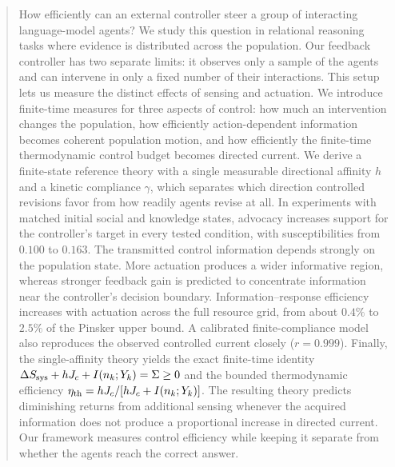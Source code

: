 \begin{abstract}
How efficiently can an external controller steer a group of interacting
language-model agents? We study this question in relational reasoning tasks
where evidence is distributed across the population. Our feedback controller
has two separate limits: it observes only a sample of the agents and can
intervene in only a fixed number of their interactions. This setup lets us
measure the distinct effects of sensing and actuation. We introduce finite-time
measures for three aspects of control: how much an intervention changes the
population, how efficiently action-dependent information becomes coherent
population motion, and how efficiently the finite-time thermodynamic control
budget becomes directed current. We derive a finite-state reference theory with a
single measurable directional affinity $h$ and a kinetic compliance $\gamma$,
which separates which direction controlled revisions favor from how readily
agents revise at all. In experiments with matched initial social and knowledge
states, advocacy increases support for the controller's target in every tested
condition, with susceptibilities from $0.100$ to $0.163$. The transmitted
control information depends strongly on the population state. More actuation
produces a wider informative region, whereas stronger feedback gain is
predicted to concentrate information near the controller's decision boundary.
Information--response efficiency increases with actuation across the full
resource grid, from about $0.4\%$ to $2.5\%$ of the Pinsker upper bound. A
calibrated finite-compliance model also reproduces the observed controlled
current closely ($r=0.999$). Finally, the single-affinity theory yields the
exact finite-time identity
$\Delta S_{\rm sys}+hJ_c+I(n_k;Y_k)=\Sigma\ge0$ and the bounded
thermodynamic efficiency
$\eta_{\rm th}=hJ_c/[hJ_c+I(n_k;Y_k)]$. The resulting theory predicts
diminishing returns from additional sensing whenever the acquired information
does not produce a proportional increase in directed current. Our framework measures control efficiency while
keeping it separate from whether the agents reach the correct answer.
\end{abstract}
